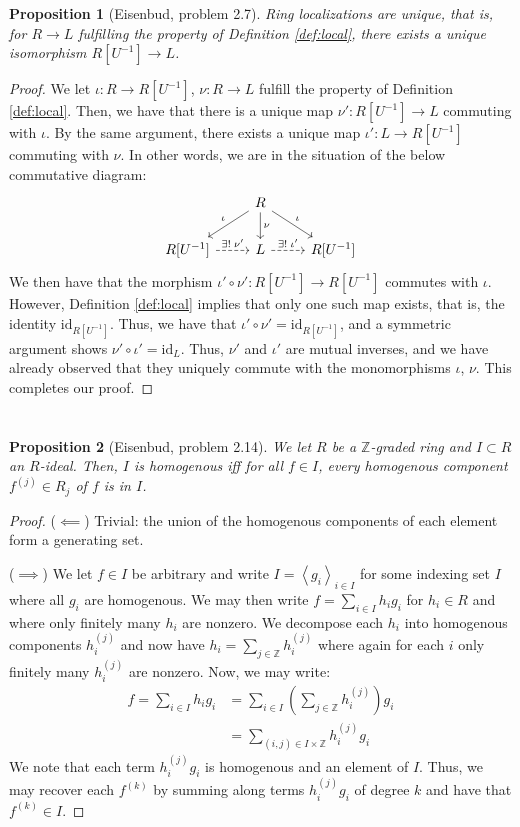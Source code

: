 \documentclass[english]{article}
\newcommand{\ZZ}{\mathbb{Z}}
\newcommand{\prob}[1]{\setcounter{section}{#1-1}\section{}}
\newtheorem*{prop*}{Proposition}
\theoremstyle{remark}
\theoremstyle{definition}
\newcommand{\id}{\mathrm{id}}
\newcommand{\idl}[1]{\left\langle{#1}\right\rangle }
\begin{document}
\begin{prop*}[Eisenbud, problem 2.7]
	Ring localizations are unique, that is, for $R\to L$ fulfilling the property of Definition \ref{def:local}, there exists a unique isomorphism $R[U^{-1}]\to L$. 
\end{prop*}
\begin{proof}
	We let $\iota: R\to R[U^{-1}]$, $\nu: R\to L$ fulfill the property of Definition \ref{def:local}. Then, we have that there is a unique map $\nu': R[U^{-1}]\to L$ commuting with $\iota$. By the same argument, there exists a unique map $\iota': L\to R[U^{-1}]$ commuting with $\nu$. In other words, we are in the situation of the below commutative diagram: 
	$$
	\begin{tikzcd}
	&R\arrow[dl,swap,"\iota"]\arrow[d,"\nu"]\arrow[dr,"\iota"]&\\
	R[U^{-1}]\arrow[r,dashrightarrow,"\exists!\;\nu'"]&L\arrow[r,dashrightarrow,"\exists!\;\iota'"]&R[U^{-1}]
	\end{tikzcd}$$
	We then have that the morphism $\iota'\circ\nu':R[U^{-1}]\to R[U^{-1}]$ commutes with $\iota$. However, Definition \ref{def:local} implies that only one such map exists, that is, the identity $\id_{R[U^{-1}]}$. Thus, we have that $\iota'\circ\nu'=\id_{R[U^{-1}]}$, and a symmetric argument shows $\nu'\circ\iota'=\id_{L}$. Thus, $\nu'$ and $\iota'$ are mutual inverses, and we have already observed that they uniquely commute with the monomorphisms $\iota$, $\nu$. This completes our proof.
\end{proof}
\prob{6}\begin{prop*}[Eisenbud, problem 2.14]
	We let $R$ be a $\ZZ$-graded ring and $I\subset R$ an $R$-ideal. Then, $I$ is homogenous iff for all $f\in I$, every homogenous component $f^{(j)}\in R_j$ of $f$ is in $I$. 
\end{prop*}
\begin{proof}
	($\impliedby$) Trivial: the union of the homogenous components of each element form a generating set.
	
	($\implies$) We let $f\in I$ be arbitrary and write $I=\idl{g_i}_{i\in I}$ for some indexing set $I$ where all $g_i$ are homogenous. We may then write $f=\sum_{i\in I}h_ig_i$ for $h_i\in R$ and where only finitely many $h_i$ are nonzero. We decompose each $h_i$ into homogenous components $h_{i}^{(j)}$ and now have $h_i=\sum_{j\in \ZZ}h_i^{(j)}$ where again for each $i$ only finitely many $h_i^{(j)}$ are nonzero. Now, we may write:
	\begin{align*}
		f=\sum_{i\in I}h_ig_i&=\sum_{i\in I}\left(\sum_{j\in \ZZ}h_i^{(j)}\right)g_i\\
	&=\sum_{(i,j)\in I\times \ZZ}h_i^{(j)}g_i
	\end{align*} 
	We note that each term $h_i^{(j)}g_i$ is homogenous and an element of $I$. Thus, we may recover each $f^{(k)}$ by summing along terms $h_i^{(j)}g_i$ of degree $k$ and have that $f^{(k)}\in I$. 
\end{proof}
\end{document}
